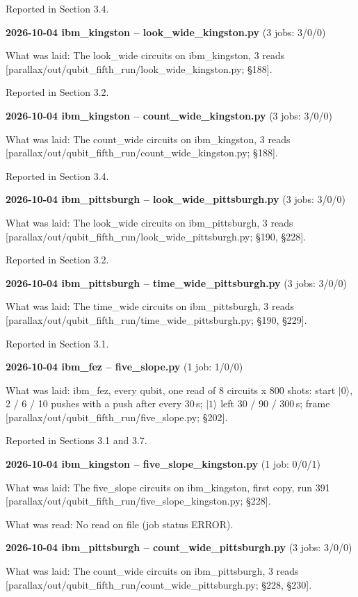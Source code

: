 \documentclass[11pt]{article}
\begin{document}
Reported in Section 3.4.

\textbf{2026-10-04 ibm\_kingston -- look\_wide\_kingston.py} (3 jobs: 3/0/0)

What was laid: The look\_wide circuits on ibm\_kingston, 3 reads {[}parallax/out/qubit\_fifth\_run/look\_wide\_kingston.py; \S{}188{]}.

Reported in Section 3.2.

\textbf{2026-10-04 ibm\_kingston -- count\_wide\_kingston.py} (3 jobs: 3/0/0)

What was laid: The count\_wide circuits on ibm\_kingston, 3 reads {[}parallax/out/qubit\_fifth\_run/count\_wide\_kingston.py; \S{}188{]}.

Reported in Section 3.4.

\textbf{2026-10-04 ibm\_pittsburgh -- look\_wide\_pittsburgh.py} (3 jobs: 3/0/0)

What was laid: The look\_wide circuits on ibm\_pittsburgh, 3 reads {[}parallax/out/qubit\_fifth\_run/look\_wide\_pittsburgh.py; \S{}190, \S{}228{]}.

Reported in Section 3.2.

\textbf{2026-10-04 ibm\_pittsburgh -- time\_wide\_pittsburgh.py} (3 jobs: 3/0/0)

What was laid: The time\_wide circuits on ibm\_pittsburgh, 3 reads {[}parallax/out/qubit\_fifth\_run/time\_wide\_pittsburgh.py; \S{}190, \S{}229{]}.

Reported in Section 3.1.

\textbf{2026-10-04 ibm\_fez -- five\_slope.py} (1 job: 1/0/0)

What was laid: ibm\_fez, every qubit, one read of 8 circuits x 800 shots: start \(|0\rangle\), 2 / 6 / 10 pushes with a push after every 30\,\textmu s; \(|1\rangle\) left 30 / 90 / 300\,\textmu s; frame {[}parallax/out/qubit\_fifth\_run/five\_slope.py; \S{}202{]}.

Reported in Sections 3.1 and 3.7.

\textbf{2026-10-04 ibm\_kingston -- five\_slope\_kingston.py} (1 job: 0/0/1)

What was laid: The five\_slope circuits on ibm\_kingston, first copy, run 391 {[}parallax/out/qubit\_fifth\_run/five\_slope\_kingston.py; \S{}228{]}.

What was read: No read on file (job status ERROR).

\textbf{2026-10-04 ibm\_pittsburgh -- count\_wide\_pittsburgh.py} (3 jobs: 3/0/0)

What was laid: The count\_wide circuits on ibm\_pittsburgh, 3 reads {[}parallax/out/qubit\_fifth\_run/count\_wide\_pittsburgh.py; \S{}228, \S{}230{]}.
\end{document}

